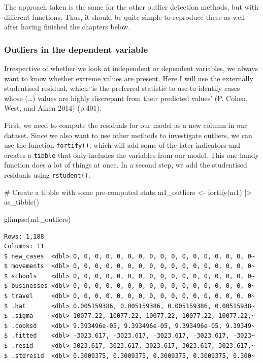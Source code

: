 \documentclass[
  letterpaper,
]{krantz}
\makeatletter
\newenvironment{Shaded}{\begin{snugshade}}{\end{snugshade}}
\newcommand{\CommentTok}[1]{\textcolor[rgb]{0.37,0.37,0.37}{#1}}
\newcommand{\FunctionTok}[1]{\textcolor[rgb]{0.28,0.35,0.67}{#1}}
\newcommand{\NormalTok}[1]{\textcolor[rgb]{0.00,0.23,0.31}{#1}}
\newcommand{\OtherTok}[1]{\textcolor[rgb]{0.00,0.23,0.31}{#1}}
\newcommand{\SpecialCharTok}[1]{\textcolor[rgb]{0.37,0.37,0.37}{#1}}
\newenvironment{kframe}{%
\medskip{}
\setlength{\fboxsep}{.8em}
 \def\at@end@of@kframe{}%
 \ifinner\ifhmode%
  \def\at@end@of@kframe{\end{minipage}}%
  \begin{minipage}{\columnwidth}%
 \fi\fi%
 \def\FrameCommand##1{\hskip\@totalleftmargin \hskip-\fboxsep
 \colorbox{shadecolor}{##1}\hskip-\fboxsep
     \hskip-\linewidth \hskip-\@totalleftmargin \hskip\columnwidth}%
 \MakeFramed {\advance\hsize-\width
   \@totalleftmargin\z@ \linewidth\hsize
   \@setminipage}}%
 {\par\unskip\endMakeFramed%
 \at@end@of@kframe}
\renewenvironment{Shaded}{\begin{kframe}}{\end{kframe}}
\makeatother
\begin{document}
The approach taken is the same for the other outlier detection methods,
but with different functions. Thus, it should be quite simple to
reproduce these as well after having finished the chapters below.

\subsubsection{Outliers in the dependent
variable}\label{sec-outliers-in-the-dependent-variable}

Irrespective of whether we look at independent or dependent variables,
we always want to know whether extreme values are present. Here I will
use the externally studentised residual, which `is the preferred
statistic to use to identify cases whose (\ldots) values are highly
discrepant from their predicted values' (P. Cohen, West, and Aiken 2014)
(p.401).

First, we need to compute the residuals for our model as a new column in
our dataset. Since we also want to use other methods to investigate
outliers, we can use the function \texttt{fortify()}, which will add
some of the later indicators and creates a \texttt{tibble} that only
includes the variables from our model. This one handy function does a
lot of things at once. In a second step, we add the studentised
residuals using \texttt{rstudent()}.

\begin{Shaded}
\begin{Highlighting}[]
\CommentTok{\# Create a tibble with some pre{-}computed stats}
\NormalTok{m1\_outliers }\OtherTok{\textless{}{-}}
  \FunctionTok{fortify}\NormalTok{(m1) }\SpecialCharTok{|\textgreater{}}
  \FunctionTok{as\_tibble}\NormalTok{()}

\FunctionTok{glimpse}\NormalTok{(m1\_outliers)}
\end{Highlighting}
\end{Shaded}

\begin{verbatim}
Rows: 1,188
Columns: 11
$ new_cases  <dbl> 0, 0, 0, 0, 0, 0, 0, 0, 0, 0, 0, 0, 0, 0, 0, 0, 0~
$ movements  <dbl> 0, 0, 0, 0, 0, 0, 0, 0, 0, 0, 0, 0, 0, 0, 0, 0, 0~
$ schools    <dbl> 0, 0, 0, 0, 0, 0, 0, 0, 0, 0, 0, 0, 0, 0, 0, 0, 0~
$ businesses <dbl> 0, 0, 0, 0, 0, 0, 0, 0, 0, 0, 0, 0, 0, 0, 0, 0, 0~
$ travel     <dbl> 0, 0, 0, 0, 0, 0, 0, 0, 0, 0, 0, 0, 0, 0, 0, 0, 0~
$ .hat       <dbl> 0.005159386, 0.005159386, 0.005159386, 0.00515938~
$ .sigma     <dbl> 10077.22, 10077.22, 10077.22, 10077.22, 10077.22,~
$ .cooksd    <dbl> 9.393496e-05, 9.393496e-05, 9.393496e-05, 9.39349~
$ .fitted    <dbl> -3023.617, -3023.617, -3023.617, -3023.617, -3023~
$ .resid     <dbl> 3023.617, 3023.617, 3023.617, 3023.617, 3023.617,~
$ .stdresid  <dbl> 0.3009375, 0.3009375, 0.3009375, 0.3009375, 0.300~
\end{verbatim}
\end{document}
